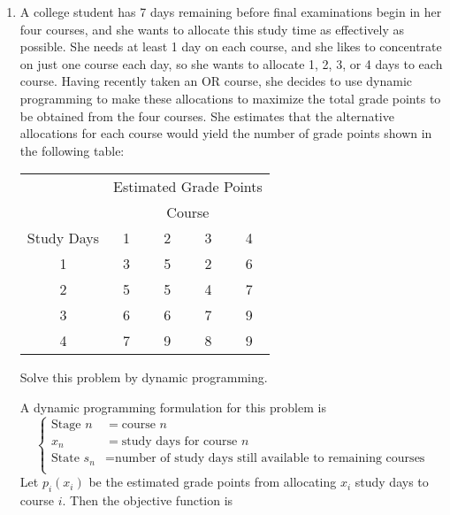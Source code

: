\documentclass[a4paper]{article}
\begin{document}
\courseheader
{}

\begin{enumerate}
  \setlength{\itemsep}{3\parskip}

  \item A college student has 7 days remaining before final examinations begin in her four courses, and she wants to allocate this study time as effectively as possible. She needs at least 1 day on each course, and she likes to concentrate on just one course each day, so she wants to allocate 1, 2, 3, or 4 days to each course. Having recently taken an OR course, she decides to use dynamic programming to make these allocations to maximize the total grade points to be obtained from the four courses. She estimates that the alternative allocations for each course would yield the number of grade points shown in the following table:
  \begin{table}[h]
  	\centering
  	\begin{tabular}{ccccc}
  		\toprule[1.5pt]
  		&\multicolumn{4}{c}{Estimated Grade Points}\\
  		\cmidrule{2-5}
  		&\multicolumn{4}{c}{Course}\\
  		\cmidrule{2-5}
  		Study Days&\hspace*{0.3cm}1\hspace*{0.3cm} &\hspace*{0.3cm}2\hspace*{0.3cm}&\hspace*{0.3cm}3\hspace*{0.3cm}&\hspace*{0.3cm}4\hspace*{0.3cm}\\
  		\midrule
  		1&3& 5& 2&6\\
  		2&5&5&4&7\\
  		3&6&6&7&9\\
  		4&7&9&8&9\\
  		\bottomrule[1.5pt]
  	\end{tabular}
  \end{table}
  
Solve this problem by dynamic programming.

\begin{solution}
	
	A dynamic programming formulation for this problem is
	\begin{equation*}\left\{
		\begin{aligned}
			\text{Stage } n&=\text{course }n\\
			x_n&=\text{study days for course }n\\
			\text{State } s_n&=\text{number of study days still available to remaining courses}\\
		\end{aligned}\right.
	\end{equation*}
	Let $p_i(x_i)$ be the estimated grade points from allocating $x_i$ study days to course $i$. Then the objective function is
	

\end{solution}
\end{enumerate}
\end{document}
